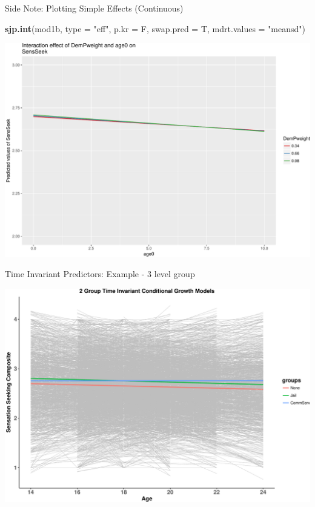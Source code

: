 \documentclass[ignorenonframetext,]{beamer}
\newenvironment{Shaded}{\begin{snugshade}}{\end{snugshade}}
\newcommand{\KeywordTok}[1]{\textcolor[rgb]{0.13,0.29,0.53}{\textbf{{#1}}}}
\newcommand{\DataTypeTok}[1]{\textcolor[rgb]{0.13,0.29,0.53}{{#1}}}
\newcommand{\StringTok}[1]{\textcolor[rgb]{0.31,0.60,0.02}{{#1}}}
\newcommand{\NormalTok}[1]{{#1}}
\begin{document}
\begin{frame}[fragile]{Side Note: Plotting Simple Effects (Continuous)}

\small

\begin{Shaded}
\begin{Highlighting}[]
\KeywordTok{sjp.int}\NormalTok{(mod1b, }\DataTypeTok{type =} \StringTok{"eff"}\NormalTok{, }\DataTypeTok{p.kr =} \NormalTok{F, }\DataTypeTok{swap.pred =} \NormalTok{T, }\DataTypeTok{mdrt.values =} \StringTok{"meansd"}\NormalTok{)}
\end{Highlighting}
\end{Shaded}

\includegraphics{Conditional_Models_files/figure-beamer/unnamed-chunk-29-1.pdf}

\normalsize  

\end{frame}

\begin{frame}{Time Invariant Predictors: Example - 3 level group}

\includegraphics{Conditional_Models_files/figure-beamer/unnamed-chunk-31-1.pdf}

\end{frame}
\end{document}
